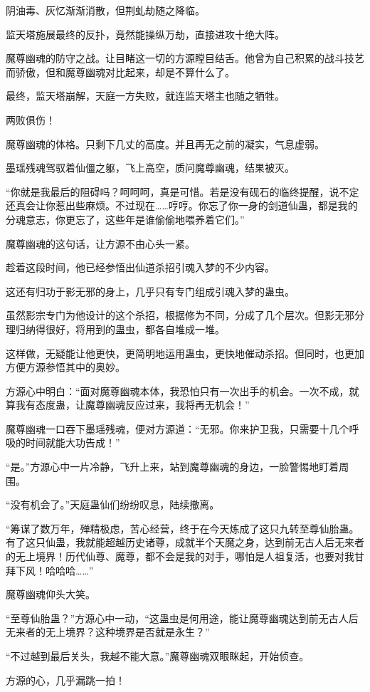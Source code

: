 \begin{this_body}
阴油毒、灰忆渐渐消散，但荆虬劫随之降临。

监天塔施展最终的反扑，竟然能操纵万劫，直接进攻十绝大阵。

魔尊幽魂的防守之战。让目睹这一切的方源瞠目结舌。他曾为自己积累的战斗技艺而骄傲，但和魔尊幽魂对比起来，却是不算什么了。

最终，监天塔崩解，天庭一方失败，就连监天塔主也随之牺牲。

两败俱伤！

魔尊幽魂的体格。只剩下几丈的高度。并且再无之前的凝实，气息虚弱。

墨瑶残魂驾驭着仙僵之躯，飞上高空，质问魔尊幽魂，结果被灭。

“你就是我最后的阻碍吗？呵呵呵，真是可惜。若是没有砚石的临终提醒，说不定还真会让你惹出些麻烦。不过现在……哼哼。你忘了你一身的剑道仙蛊，都是我的分魂意志，你更忘了，这些年是谁偷偷地喂养着它们。”

魔尊幽魂的这句话，让方源不由心头一紧。

趁着这段时间，他已经参悟出仙道杀招引魂入梦的不少内容。

这还有归功于影无邪的身上，几乎只有专门组成引魂入梦的蛊虫。

虽然影宗专门为他设计的这个杀招，根据修为不同，分成了几个层次。但影无邪分理归纳得很好，将用到的蛊虫，都各自堆成一堆。

这样做，无疑能让他更快，更简明地运用蛊虫，更快地催动杀招。但同时，也更加方便方源参悟其中的奥妙。

方源心中明白：“面对魔尊幽魂本体，我恐怕只有一次出手的机会。一次不成，就算我有态度蛊，让魔尊幽魂反应过来，我将再无机会！”

魔尊幽魂一口吞下墨瑶残魂，便对方源道：“无邪。你来护卫我，只需要十几个呼吸的时间就能大功告成！”

“是。”方源心中一片冷静，飞升上来，站到魔尊幽魂的身边，一脸警惕地盯着周围。

“没有机会了。”天庭蛊仙们纷纷叹息，陆续撤离。

“筹谋了数万年，殚精极虑，苦心经营，终于在今天炼成了这只九转至尊仙胎蛊。有了这只仙蛊，我就能超越历史诸尊，成就半个天魔之身，达到前无古人后无来者的无上境界！历代仙尊、魔尊，都不会是我的对手，哪怕是人祖复活，也要对我甘拜下风！哈哈哈……”

魔尊幽魂仰头大笑。

“至尊仙胎蛊？”方源心中一动，“这蛊虫是何用途，能让魔尊幽魂达到前无古人后无来者的无上境界？这种境界是否就是永生？”

“不过越到最后关头，我越不能大意。”魔尊幽魂双眼眯起，开始侦查。

方源的心，几乎漏跳一拍！


\end{this_body}
